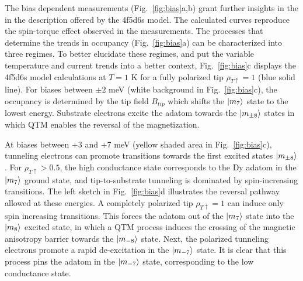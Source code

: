 \documentclass[
reprint,amsmath,amssymb,aps]{revtex4-2}
\begin{document}
The bias dependent measurements (Fig.~\ref{fig:bias}a,b) grant further insights in the in the description offered by the 4f5d6s model. The calculated curves reproduce the spin-torque effect observed in the measurements. The processes that determine the trends in occupancy (Fig.~\ref{fig:bias}a) can be characterized into three regimes. To better elucidate these regimes, and put the variable temperature and current trends into a better context, Fig.~\ref{fig:bias}c displays the 4f5d6s model calculations at $T=1$ K for a fully polarized tip $\rho_{T \uparrow} = 1 $ (blue solid line). For biases between $\pm 2$ meV (white background in Fig.~\ref{fig:bias}c), the occupancy is determined by the tip field $B_{tip}$ which shifts the $\ket{m_{7}}$ state to the lowest energy. Substrate electrons excite the adatom towards the $\ket{m_{\pm8}}$ states in which QTM enables the reversal of the magnetization.

At biases between $+3$ and $+7$ meV (yellow shaded area in Fig.~\ref{fig:bias}c), tunneling electrons can promote transitions towards the first excited states $\ket{m_{\pm 8}}$. For $\rho_{T \uparrow} > 0.5 $, the high conductance state corresponds to the Dy adatom in the $\ket{m_{7}}$ ground state, and tip-to-substrate tunneling is dominated by spin-increasing transitions. The left sketch in Fig.~\ref{fig:bias}d illustrates the reversal pathway allowed at these energies. A completely polarized tip $\rho_{T \uparrow} = 1$ can induce only spin increasing transitions. This forces the adatom out of the $\ket{m_{7}}$ state into the $\ket{m_{8}}$ excited state, in which a QTM process induces the crossing of the magnetic anisotropy barrier towards the $\ket{m_{-8}}$ state. Next, the polarized tunneling electrons promote a rapid de-excitation in the $\ket{m_{-7}}$ state. It is clear that this process pins the adatom in the $\ket{m_{-7}}$ state, corresponding to the low conductance state.
\end{document}
